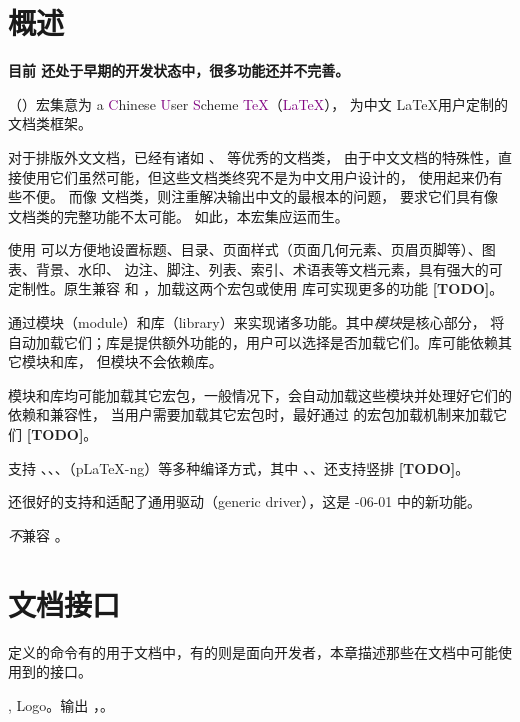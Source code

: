\documentclass[twoside]{book}
\newcommand*{\TODO}{\textcolor{red!90!black}{\bfseries[TODO]}}
\begin{document}
\chapter{概述}

{\color{red}\bfseries 目前 \WhuTeX 还处于早期的开发状态中，很多功能还并不完善。}

\WhuTeX （\WhuLaTeX）宏集意为 a \textcolor{purple}Chinese \textcolor{purple}User
\textcolor{purple}Scheme \textcolor{purple}\TeX（\textcolor{purple}{\LaTeX}），
为中文 \LaTeX 用户定制的文档类框架。

对于排版外文文档，已经有诸如 、 等优秀的文档类，
由于中文文档的特殊性，直接使用它们虽然可能，但这些文档类终究不是为中文用户设计的，
使用起来仍有些不便。
而像  文档类，则注重解决输出中文的最根本的问题，
要求它们具有像  文档类的完整功能不太可能。
如此，本宏集应运而生。

使用 \WhuTeX 可以方便地设置标题、目录、页面样式（页面几何元素、页眉页脚等）、图表、背景、水印、
边注、脚注、列表、索引、术语表等文档元素，具有强大的可定制性。\WhuTeX 原生兼容  和 
，加载这两个宏包或使用  库可实现更多的功能 \TODO。

\WhuTeX 通过模块（module）和库（library）来实现诸多功能。其中\emph{模块}是核心部分，
\WhuTeX 将自动加载它们；库是提供额外功能的，用户可以选择是否加载它们。库可能依赖其它模块和库，
但模块不会依赖库。

模块和库均可能加载其它宏包，一般情况下，\WhuTeX 会自动加载这些模块并处理好它们的依赖和兼容性，
当用户需要加载其它宏包时，最好通过 \WhuTeX 的宏包加载机制来加载它们 \TODO。

\WhuTeX 支持 \XeLaTeX、\LuaLaTeX、\upLaTeX、\ApLaTeX（p\LaTeX-ng）等多种编译方式，其中
\LuaLaTeX、\upLaTeX、\ApLaTeX 还支持竖排 \TODO。

\WhuTeX 还很好的支持和适配了通用驱动（generic driver），这是 -06-01 中的新功能。

\emph{不}兼容 。

\chapter{文档接口}

\WhuTeX 定义的命令有的用于文档中，有的则是面向开发者，本章描述那些在文档中可能使用到的接口。

\begin{function}{\WhuTeX,\WhuLaTeX}
Logo。输出 \WhuTeX，\WhuLaTeX。
\end{function}
\end{document}

